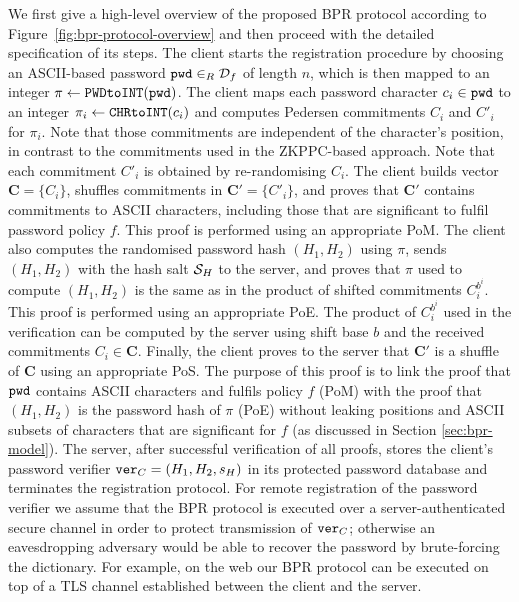 We first give a high-level overview of the proposed \ac{BPR} protocol according to Figure~\ref{fig:bpr-protocol-overview} and then proceed with the detailed specification of its steps. The client starts the registration procedure by choosing an ASCII-based password $\mathtt{pwd}\in_R\mathcal{D}_f$ of length $n$, which is then mapped to an integer $\pi\gets\texttt{PWDtoINT}(\mathtt{pwd})$.
The client maps each password character $c_i\in\mathtt{pwd}$ to an integer $\pi_i\gets\texttt{CHRtoINT}(c_i)$ and computes Pedersen commitments $C_i$ and $C'_i$ for $\pi_i$. 
Note that those commitments are independent of the character's position, in contrast to the commitments used in the \ac{ZKPPC}-based approach.
Note that each commitment $C'_i$ is obtained by re-randomising $C_i$. 
The client builds vector $\bm{C}=\{C_i\}$, shuffles commitments in $\bm{C'}=\{C'_i\}$, and proves that $\bm C'$ contains commitments to ASCII characters, including those that are significant to fulfil password policy $f$. 
This proof is performed using an appropriate \ac{PoM}.
The client also computes the randomised password hash $(H_1, H_2)$ using $\pi$, sends $(H_1, H_2)$ with the hash salt $\mathcal{S}_H$ to the server, and proves that $\pi$ used to compute $(H_1, H_2)$ is the same as in the product of shifted commitments $C^{{b^i}}_i$. 
This proof is performed using an appropriate \ac{PoE}.
The product of $C^{b^i}_i$ used in the verification can be computed by the server using shift base $b$ and the received commitments $C_i\in \bm C$.
Finally, the client proves to the server that $\bm C'$ is a shuffle of $\bm C$ using an appropriate \ac{PoS}. 
The purpose of this proof is to link the proof that $\mathtt{pwd}$ contains \ac{ASCII} characters and fulfils policy $f$ (\ac{PoM}) with the proof that $(H_1, H_2)$ is the password hash of $\pi$ (\ac{PoE}) without leaking positions and ASCII subsets of characters that are significant for $f$ (as discussed in Section \ref{sec:bpr-model}). 
The server, after successful verification of all proofs, stores the client's password verifier $\mathtt{ver}_C = (H_1,H_2,s_H)$ in its protected password database and terminates the registration protocol. 
For remote registration of the password verifier we assume that the \ac{BPR} protocol is executed over a server-authenticated secure channel in order to protect transmission of $\mathtt{ver}_C$; otherwise an eavesdropping adversary would be able to recover the password by brute-forcing the dictionary. 
For example, on the web our \ac{BPR} protocol can be executed on top of a TLS channel established between the client and the server.
